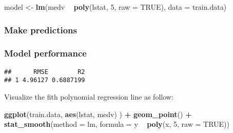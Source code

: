 \documentclass[]{article}
\newenvironment{Shaded}{\begin{snugshade}}{\end{snugshade}}
\newcommand{\DataTypeTok}[1]{\textcolor[rgb]{0.13,0.29,0.53}{#1}}
\newcommand{\DecValTok}[1]{\textcolor[rgb]{0.00,0.00,0.81}{#1}}
\newcommand{\KeywordTok}[1]{\textcolor[rgb]{0.13,0.29,0.53}{\textbf{#1}}}
\newcommand{\NormalTok}[1]{#1}
\newcommand{\OperatorTok}[1]{\textcolor[rgb]{0.81,0.36,0.00}{\textbf{#1}}}
\newcommand{\OtherTok}[1]{\textcolor[rgb]{0.56,0.35,0.01}{#1}}
\newcommand{\StringTok}[1]{\textcolor[rgb]{0.31,0.60,0.02}{#1}}
\begin{document}
\begin{Shaded}
\begin{Highlighting}[]
\NormalTok{model <-}\StringTok{ }\KeywordTok{lm}\NormalTok{(medv }\OperatorTok{~}\StringTok{ }\KeywordTok{poly}\NormalTok{(lstat, }\DecValTok{5}\NormalTok{, }\DataTypeTok{raw =} \OtherTok{TRUE}\NormalTok{), }\DataTypeTok{data =}\NormalTok{ train.data)}
\end{Highlighting}
\end{Shaded}

\hypertarget{make-predictions}{%
\subsubsection{Make predictions}\label{make-predictions}}

\begin{Shaded}
\end{Shaded}

\hypertarget{model-performance}{%
\subsubsection{Model performance}\label{model-performance}}

\begin{Shaded}
\end{Shaded}

\begin{verbatim}
##      RMSE        R2
## 1 4.96127 0.6887199
\end{verbatim}

Visualize the fith polynomial regression line as follow:

\begin{Shaded}
\begin{Highlighting}[]
\KeywordTok{ggplot}\NormalTok{(train.data, }\KeywordTok{aes}\NormalTok{(lstat, medv) ) }\OperatorTok{+}
\StringTok{  }\KeywordTok{geom_point}\NormalTok{() }\OperatorTok{+}
\StringTok{  }\KeywordTok{stat_smooth}\NormalTok{(}\DataTypeTok{method =}\NormalTok{ lm, }\DataTypeTok{formula =}\NormalTok{ y }\OperatorTok{~}\StringTok{ }\KeywordTok{poly}\NormalTok{(x, }\DecValTok{5}\NormalTok{, }\DataTypeTok{raw =} \OtherTok{TRUE}\NormalTok{))}
\end{Highlighting}
\end{Shaded}
\end{document}
